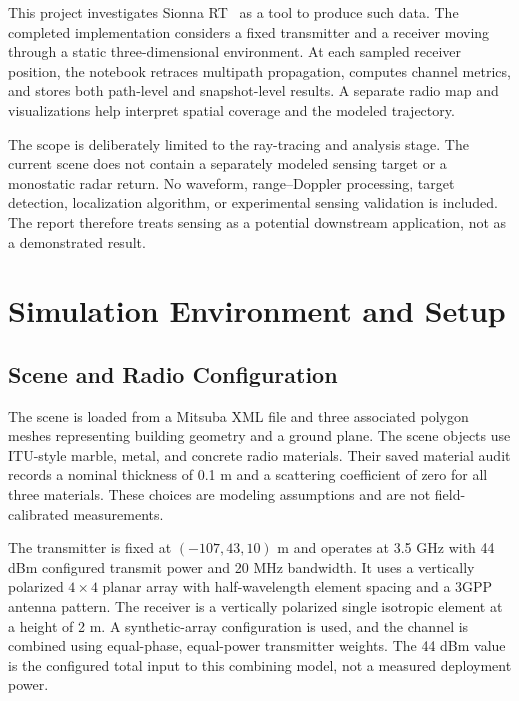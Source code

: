 \documentclass[conference]{IEEEtran}
\begin{document}
This project investigates Sionna RT~\cite{sionna2025,sionna2023} as a tool to produce such data. The completed implementation considers a fixed transmitter and a receiver moving through a static three-dimensional environment. At each sampled receiver position, the notebook retraces multipath propagation, computes channel metrics, and stores both path-level and snapshot-level results. A separate radio map and visualizations help interpret spatial coverage and the modeled trajectory.

The scope is deliberately limited to the ray-tracing and analysis stage. The current scene does not contain a separately modeled sensing target or a monostatic radar return. No waveform, range--Doppler processing, target detection, localization algorithm, or experimental sensing validation is included. The report therefore treats sensing as a potential downstream application, not as a demonstrated result.

\section{Simulation Environment and Setup}
\subsection{Scene and Radio Configuration}
The scene is loaded from a Mitsuba XML file and three associated polygon meshes representing building geometry and a ground plane. The scene objects use ITU-style marble, metal, and concrete radio materials. Their saved material audit records a nominal thickness of 0.1 m and a scattering coefficient of zero for all three materials. These choices are modeling assumptions and are not field-calibrated measurements.

The transmitter is fixed at $(-107,43,10)$ m and operates at 3.5 GHz with 44 dBm configured transmit power and 20 MHz bandwidth. It uses a vertically polarized $4\times4$ planar array with half-wavelength element spacing and a 3GPP antenna pattern. The receiver is a vertically polarized single isotropic element at a height of 2 m. A synthetic-array configuration is used, and the channel is combined using equal-phase, equal-power transmitter weights. The 44 dBm value is the configured total input to this combining model, not a measured deployment power.
\end{document}
